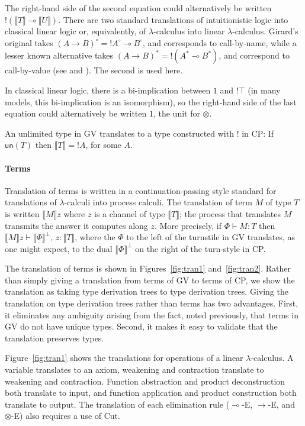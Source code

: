 \documentclass{jfp1}
\newcommand{\typecolor}{}
\newcommand{\tp}[1]{{\typecolor #1}}
\newcommand{\bvdash}{\tp{{} \vdash {}}}
\newcommand{\lolli}{\multimap}
\newcommand{\comma}{,\,}
\newcommand{\un}{\key{un}}
\newcommand{\key}{\textsf}
\newcommand{\sem}[1]{\llbracket #1 \rrbracket}
\begin{document}
The right-hand side of the second
equation could alternatively be written
$!(\sem{T} \lolli \sem{U})$.
There are two standard translations of intuitionistic
logic into classical linear logic or, equivalently,
of $\lambda$-calculus into linear $\lambda$-calculus.
Girard's original takes $(A \to B)^\circ = {!A^\circ \lolli B^\circ}$,
and corresponds to call-by-name,
while a lesser known alternative takes $(A \to B)^* = {!(A^* \lolli B^*)}$,
and correspond to call-by-value
(see \citet{BentonWadler96} and \citet{ToninhoEtAl12}).
The second is used here.

In classical linear logic, there is a bi-implication between $1$ and
$!\top$ (in many models, this bi-implication is an isomorphism), so
the right-hand side of the last equation could alternatively be
written $1$, the unit for $\otimes$.

An unlimited type in GV translates to a type
constructed with $!$ in CP:
If $\un(T)$ then $\sem{T} = {!A}$, for some $A$.

\paragraph*{Terms}
Translation of terms is written in a continuation-passing style
standard for translations of $\lambda$-calculi into process calculi.  The
translation of term $M$ of type $T$ is written $\sem{M}z$ where $z$ is
a channel of type $\sem{T}$; the process that translates $M$ transmits
the answer it computes along $z$.  More precisely, if $\Phi \bvdash
M:T$ then $\sem{M}z \bvdash \sem{\Phi}^\bot \comma z : \sem{T}$, where
the $\Phi$ to the left of the turnstile in GV translates, as one might
expect, to the dual $\sem{\Phi}^\bot$ on the right of the turn-style in
CP.

The translation of terms is shown in Figures~\ref{fig:tran1}
and~\ref{fig:tran2}.  Rather than simply giving a translation from
terms of GV to terms of CP, we show the translation as taking
type derivation trees to type derivation trees.  Giving the
translation on type derivation trees rather than terms has two
advantages.  First, it eliminates any ambiguity arising from the fact,
noted previously, that terms in GV do not have unique types.  Second,
it makes it easy to validate that the translation preserves types.

Figure~\ref{fig:tran1} shows the translations for operations of a
linear $\lambda$-calculus.  A variable translates to an axiom,
weakening and contraction translate to weakening and contraction.
Function abstraction and product deconstruction both translate to input,
and function application and product construction both translate to output.
The translation of each elimination rule
($\lolli$-E, $\to$-E, and $\otimes$-E) also requires a use of Cut.
\end{document}
